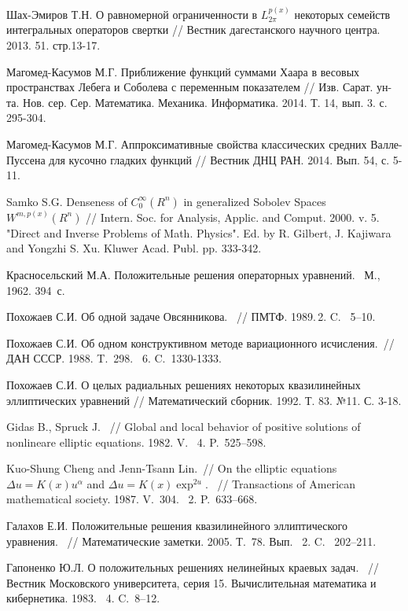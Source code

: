 \begin{thebibliography}{1}
Шах-Эмиров Т.Н.
{О равномерной ограниченности в $L^{p(x)}_{2\pi}$ некоторых семейств интегральных операторов свертки // Вестник дагестанского научного центра. 2013. 51. стр.13-17.}


Магомед-Касумов М.Г.
Приближение функций суммами Хаара в весовых пространствах Лебега и Соболева с переменным показателем // Изв. Сарат. ун-та. Нов. сер. Сер. Математика. Механика. Информатика. 2014. Т. 14, вып. 3. с. 295-304.

Магомед-Касумов М.Г.
Аппроксимативные свойства классических средних Валле-Пуссена для кусочно гладких функций // Вестник ДНЦ РАН. 2014. Вып. 54, с. 5-11.

Samko S.G.
{Denseness of $C_0^\infty(R^n)$ in generalized Sobolev Spaces $W^{m,p(x)}(R^n)$ // Intern. Soc. for Analysis, Applic. and Comput. 2000. v. 5. "Direct and Inverse Problems of Math. Physics".
Ed. by R. Gilbert, J. Kajiwara and Yongzhi S. Xu. Kluwer Acad. Publ. pp. 333-342.}

Красносельский М.А. Положительные решения операторных уравнений. ~М., 1962. 394~с.

Похожаев С.И. Об одной задаче Овсянникова. ~// ПМТФ. 1989.\No\,2. C. ~5--10.

Похожаев С.И. Об одном конструктивном методе вариационного исчисления.~// ДАН СССР. 1988. T.~298. \No\, 6. C.~1330-1333.

Похожаев С.И. О целых радиальных решениях некоторых квазилинейных эллиптических  уравнений // Математический сборник. 1992. Т. 83. №11. С. 3-18.

Gidas B., Spruck  J. ~// Global and local behavior of positive solutions
of nonlineare elliptic equations. 1982. V.~ 4. P.~525--598.

Kuo-Shung Cheng and Jenn-Tsann Lin.~// On the elliptic equations $\Delta u=K(x)u^{\alpha}$ and $\Delta u=K(x)\exp^{2u}$.
 ~// Transactions of American mathematical society. 1987. V.~304.
\No\, 2. P.~633--668.

Галахов Е.И. Положительные решения квазилинейного эллиптического уравнения.
 ~// Математические заметки. 2005. Т.~78. Вып.~ 2. C. ~202--211.

Гапоненко Ю.Л. О положительных решениях нелинейных краевых задач.
~// Вестник Московского университета, серия 15. Вычислительная математика и
кибернетика. 1983. \No\, 4. C.~8--12.


\end{thebibliography}
